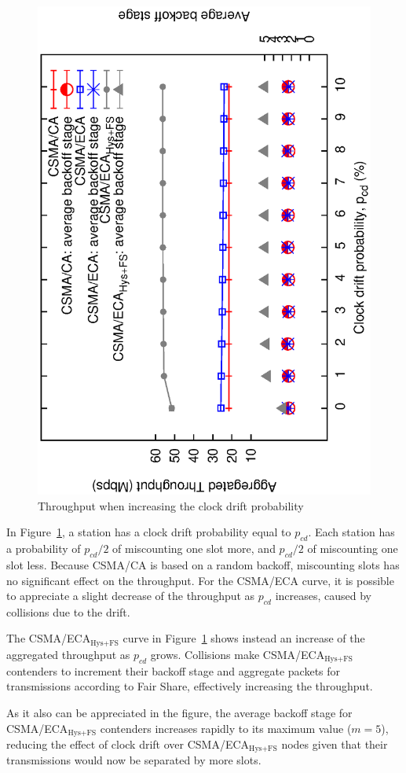 	\begin{figure}[tb]
	\centering
		\includegraphics[width=0.7\linewidth,angle=-90]{figures/clockDrift/throughput_and_BOS_w_SD.eps}
		\caption{Throughput when increasing the clock drift probability}
		\label{fig:clockDrift}
	\end{figure}
	
	In Figure~\ref{fig:clockDrift}, a station has a clock drift probability equal to $p_{cd}$. Each station has a probability of $p_{cd}/2$ of miscounting one slot more, and $p_{cd}/2$ of miscounting one slot less. Because CSMA/CA is based on a random backoff, miscounting slots has no significant effect on the throughput. For the CSMA/ECA curve, it is possible to appreciate a slight decrease of the throughput as $p_{cd}$ increases, caused by collisions due to the drift.
	
	The CSMA/ECA$_{\text{Hys+FS}}$ curve in Figure~\ref{fig:clockDrift} shows instead an increase of the aggregated throughput as $p_{cd}$ grows. Collisions make CSMA/ECA$_{\text{Hys+FS}}$ contenders to increment their backoff stage and aggregate packets for transmissions according to Fair Share, effectively increasing the throughput. 
	
	As it also can be appreciated in the figure, the average backoff stage for CSMA/ECA$_{\text{Hys+FS}}$ contenders increases rapidly to its maximum value ($m=5$), reducing the effect of clock drift over CSMA/ECA$_{\text{Hys+FS}}$ nodes given that their transmissions would now be separated by more slots.\\
	
